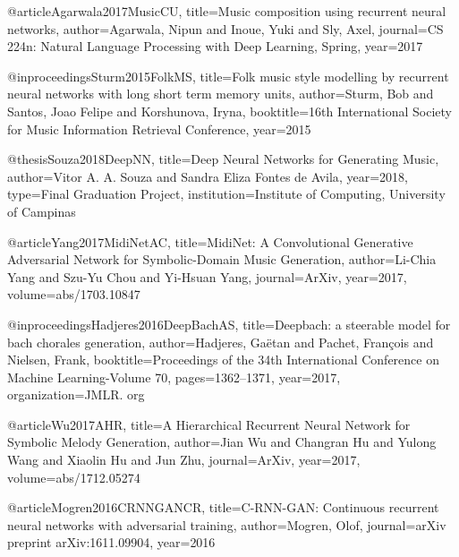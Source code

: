 
@article{Agarwala2017MusicCU,
  title={Music composition using recurrent neural networks},
  author={Agarwala, Nipun and Inoue, Yuki and Sly, Axel},
  journal={CS 224n: Natural Language Processing with Deep Learning, Spring},
  year={2017}
}

@inproceedings{Sturm2015FolkMS,
  title={Folk music style modelling by recurrent neural networks with long short term memory units},
  author={Sturm, Bob and Santos, Joao Felipe and Korshunova, Iryna},
  booktitle={16th International Society for Music Information Retrieval Conference},
  year={2015}
}

@thesis{Souza2018DeepNN,
  title={Deep Neural Networks for Generating Music},
  author={Vitor A. A. Souza and Sandra Eliza Fontes de Avila},
  year={2018},
  type={Final Graduation Project},
  institution={Institute of Computing, University of Campinas}
}

@article{Yang2017MidiNetAC,
  title={MidiNet: A Convolutional Generative Adversarial Network for Symbolic-Domain Music Generation},
  author={Li-Chia Yang and Szu-Yu Chou and Yi-Hsuan Yang},
  journal={ArXiv},
  year={2017},
  volume={abs/1703.10847}
}

@inproceedings{Hadjeres2016DeepBachAS,
  title={Deepbach: a steerable model for bach chorales generation},
  author={Hadjeres, Ga{\"e}tan and Pachet, Fran{\c{c}}ois and Nielsen, Frank},
  booktitle={Proceedings of the 34th International Conference on Machine Learning-Volume 70},
  pages={1362--1371},
  year={2017},
  organization={JMLR. org}
}

@article{Wu2017AHR,
  title={A Hierarchical Recurrent Neural Network for Symbolic Melody Generation},
  author={Jian Wu and Changran Hu and Yulong Wang and Xiaolin Hu and Jun Zhu},
  journal={ArXiv},
  year={2017},
  volume={abs/1712.05274}
}

@article{Mogren2016CRNNGANCR,
  title={C-RNN-GAN: Continuous recurrent neural networks with adversarial training},
  author={Mogren, Olof},
  journal={arXiv preprint arXiv:1611.09904},
  year={2016}
}

